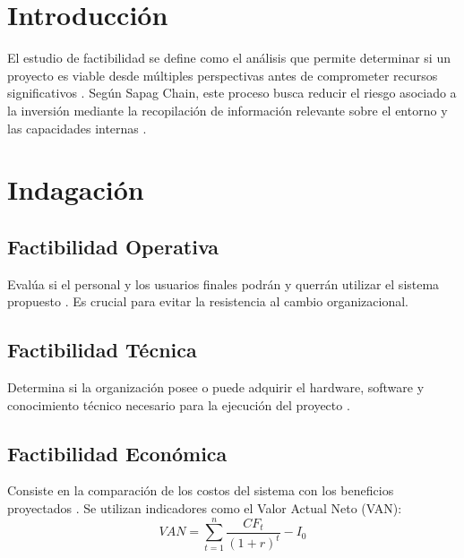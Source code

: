 \documentclass[12pt, letterpaper]{article}
\begin{document}
\setcounter{page}{1}
\renewcommand{\contentsname}{Índice de Contenido}
\tableofcontents
\newpage

\setcounter{page}{1}
\justifying



\section{Introducción}

El estudio de factibilidad se define como el análisis que permite determinar si un proyecto es viable desde múltiples perspectivas antes de comprometer recursos significativos \cite{baca2013}. Según Sapag Chain, este proceso busca reducir el riesgo asociado a la inversión mediante la recopilación de información relevante sobre el entorno y las capacidades internas \cite{sapag2011}.

\section{Indagación}

\subsection{Factibilidad Operativa}
Evalúa si el personal y los usuarios finales podrán y querrán utilizar el sistema propuesto \cite{kendall2011}. Es crucial para evitar la resistencia al cambio organizacional.

\subsection{Factibilidad Técnica}
Determina si la organización posee o puede adquirir el hardware, software y conocimiento técnico necesario para la ejecución del proyecto \cite{pressman2010}.

\subsection{Factibilidad Económica}
Consiste en la comparación de los costos del sistema con los beneficios proyectados \cite{sapag2011}. Se utilizan indicadores como el Valor Actual Neto (VAN):
$$VAN = \sum_{t=1}^{n} \frac{CF_t}{(1+r)^t} - I_0$$
\end{document}
